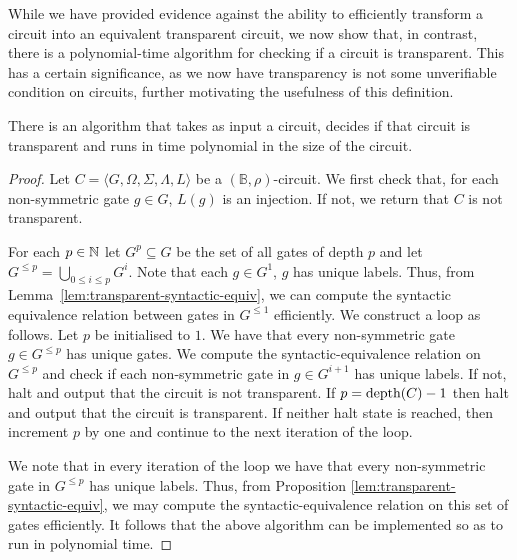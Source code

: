 \documentclass[../paper.tex]{subfiles}
\begin{document}



While we have provided evidence against the ability to efficiently transform a
circuit into an equivalent transparent circuit, we now show that, in contrast,
there is a polynomial-time algorithm for checking if a circuit is transparent.
This has a certain significance, as we now have transparency is not some
unverifiable condition on circuits, further motivating the usefulness of this
definition.

\begin{prop}
  There is an algorithm that takes as input a circuit, decides if that circuit
  is transparent and runs in time polynomial in the size of the circuit.
  \label{prop:transparent-polynomial-time}
\end{prop}
\begin{proof}
  Let $C = \langle G, \Omega, \Sigma, \Lambda, L \rangle$ be a $(\mathbb{B},
  \rho)$-circuit. We first check that, for each non-symmetric gate $g \in G$,
  $L(g)$ is an injection. If not, we return that $C$ is not transparent.

  For each $p \in \mathbb{N}$ let $G^p \subseteq G$ be the set of all gates of depth
  $p$ and let $G^{\leq p} = \bigcup_{0 \leq i \leq p}G^i$. Note that each $g \in
  G^1$, $g$ has unique labels. Thus, from
  Lemma~\ref{lem:transparent-syntactic-equiv}, we can compute the syntactic
  equivalence relation between gates in $G^{\leq 1}$ efficiently. We construct a
  loop as follows. Let $p$ be initialised to $1$. We have that every
  non-symmetric gate $g \in G^{\leq p}$ has unique gates. We compute the
  syntactic-equivalence relation on $G^{\leq p}$ and check if each non-symmetric
  gate in $g \in G^{i + 1}$ has unique labels. If not, halt and output that the
  circuit is not transparent. If $p = \text{depth}(C) -1$ then halt and output that
  the circuit is transparent. If neither halt state is reached, then increment
  $p$ by one and continue to the next iteration of the loop.

  We note that in every iteration of the loop we have that every non-symmetric
  gate in $G^{\leq p}$ has unique labels. Thus, from Proposition
  \ref{lem:transparent-syntactic-equiv}, we may compute the
  syntactic-equivalence relation on this set of gates efficiently. It follows
  that the above algorithm can be implemented so as to run in polynomial time.
\end{proof}
\end{document}
